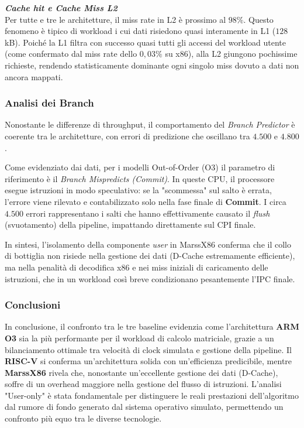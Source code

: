 \documentclass[../../main_document/main.tex]{subfiles}
\begin{document}
\vspace{8pt}
\noindent
\textbf{\textit{Cache hit e Cache Miss L2}}\\
Per tutte e tre le architetture, il miss rate in L2 è prossimo al $98\%$. Questo fenomeno è tipico di workload i cui dati risiedono quasi interamente in L1 ($128$ kB). Poiché la L1 filtra con successo quasi tutti gli accessi del workload utente (come confermato dal miss rate dello $0,03\%$ su x86), alla L2 giungono pochissime richieste, rendendo statisticamente dominante ogni singolo miss dovuto a dati non ancora mappati.

\subsubsection{Analisi dei Branch}
Nonostante le differenze di throughput, il comportamento del \textit{Branch Predictor} è coerente tra le architetture, con errori di predizione che oscillano tra $4.500$ e $4.800$.

\vspace{8pt}
\noindent
Come evidenziato dai dati, per i modelli Out-of-Order (O3) il parametro di riferimento è il \textit{Branch Mispredicts (Commit)}. In queste CPU, il processore esegue istruzioni in modo speculativo: se la "scommessa" sul salto è errata, l'errore viene rilevato e contabilizzato solo nella fase finale di \textbf{Commit}. I circa $4.500$ errori rappresentano i salti che hanno effettivamente causato il \textit{flush} (svuotamento) della pipeline, impattando direttamente sul CPI finale. 

\vspace{8pt}
\noindent
In sintesi, l'isolamento della componente \textit{user} in MarssX86 conferma che il collo di bottiglia non risiede nella gestione dei dati (D-Cache estremamente efficiente), ma nella penalità di decodifica x86 e nei miss iniziali di caricamento delle istruzioni, che in un workload così breve condizionano pesantemente l'IPC finale.

\subsubsection{Conclusioni}
In conclusione, il confronto tra le tre baseline evidenzia come l'architettura \textbf{ARM O3} sia la più performante per il workload di calcolo matriciale, grazie a un bilanciamento ottimale tra velocità di clock simulata e gestione della pipeline. Il \textbf{RISC-V} si conferma un'architettura solida con un'efficienza predicibile, mentre \textbf{MarssX86} rivela che, nonostante un'eccellente gestione dei dati (D-Cache), soffre di un overhead maggiore nella gestione del flusso di istruzioni. L'analisi "User-only" è stata fondamentale per distinguere le reali prestazioni dell'algoritmo dal rumore di fondo generato dal sistema operativo simulato, permettendo un confronto più equo tra le diverse tecnologie.
\end{document}
